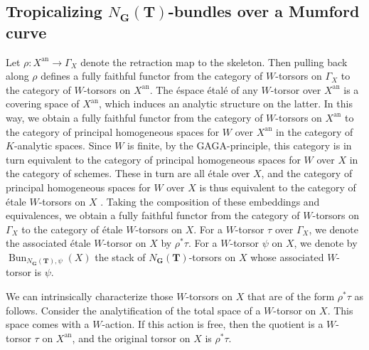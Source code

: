 \documentclass[10pt, a4paper]{amsart}
\theoremstyle{definition}
\theoremstyle{myitemstyle}
\newcommand{\bfG}{\mathbf{G}}
\newcommand{\bfT}{\mathbf{T}}
\DeclareMathOperator{\Bun}{Bun}
\newcommand{\an}{\mathrm{an}}
\begin{document}
\subsection{Tropicalizing $N_\bfG(\bfT)$-bundles over a Mumford curve}
\label{sec:tropicalizing NG-bundles}
Let $\rho\colon X^{\an}\to \Gamma_X$ denote the retraction map to the skeleton. Then pulling back along $\rho$ defines a fully faithful functor from the category of $W$-torsors on $\Gamma_X$ to the category of $W$-torsors on $X^\an$. The \'{e}space \'{e}tal\'{e} of any $W$-torsor over $X^\an$ is a covering space of $X^\an$, which induces an analytic structure on the latter.  In this way, we obtain a fully faithful functor from the category of $W$-torsors on $X^\an$ to the category of principal homogeneous spaces for $W$ over $X^\an$ in the category of $K$-analytic spaces. Since $W$ is finite, by the GAGA-principle, this category is in turn equivalent to the category of principal homogeneous spaces for $W$ over $X$ in the category of schemes. These in turn are all \'{e}tale over $X$, and the category of principal homogeneous spaces for $W$ over $X$ is thus equivalent to the category of \'{e}tale $W$-torsors on $X$ \cite[III, Theorem 4.3]{MilneEtale}. Taking the composition of these embeddings and equivalences, we obtain a fully faithful functor from the category of $W$-torsors on $\Gamma_X$ to the category of \'{e}tale $W$-torsors on $X$. For a $W$-torsor $\tau$ over $\Gamma_X$, we denote the associated \'{e}tale $W$-torsor on $X$ by $\rho^*\tau$. For a $W$-torsor $\psi$ on $X$, we denote by $\Bun_{N_\bfG(\bfT),\psi}(X)$ the stack of $N_\bfG(\bfT)$-torsors on $X$ whose associated $W$-torsor is $\psi$. 

We can intrinsically characterize those $W$-torsors on $X$ that are of the form $\rho^*\tau$ as follows. Consider the analytification of the total space of a $W$-torsor on $X$. This space comes with a $W$-action. If this action is free, then the quotient is a $W$-torsor $\tau$ on $X^{\an}$, and the original torsor on $X$ is $\rho^*\tau$.
\end{document}

